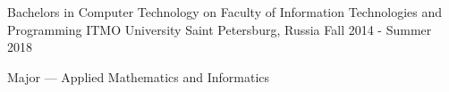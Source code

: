 

\begin{cventries}

  \cventry
    {Bachelor\textquotesingle s in Computer Technology on Faculty of Information Technologies and Programming} %
    {ITMO University} %
    {Saint Petersburg, Russia} %
    {Fall 2014 - Summer 2018} %
    {
      \begin{cvitems} %
        \item {Major --- Applied Mathematics and Informatics}
      \end{cvitems}
    }

\end{cventries}
